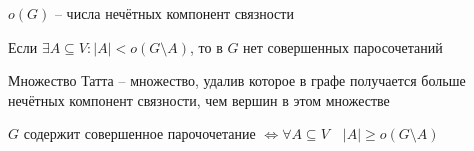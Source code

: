 \documentclass{book}
\theoremstyle{definition}
\begin{document}
\begin{definition}
    $o(G)$ -- числа нечётных компонент связности
\end{definition}

\begin{statement}
    Если $\exists A\subseteq V: |A| < o(G\setminus A)$, то в $G$ нет совершенных паросочетаний
\end{statement}

\begin{definition}
    Множество Татта -- множество, удалив которое в графе получается больше нечётных компонент связности, чем вершин в этом множестве
\end{definition}

\begin{theorem}
    [Татта]

    $G$ содержит совершенное парочочетание  $\iff \forall A \subseteq V\quad |A| \geqslant o(G\setminus A)$
\end{theorem}
\end{document}

